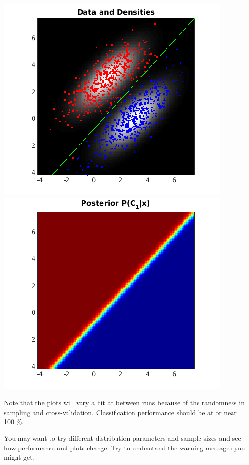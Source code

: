 \documentclass[10pt,a4paper,notitlepage]{report}
\begin{document}
\includegraphics[scale=0.6]{p1fig1.png}
\includegraphics[scale=0.6]{p1fig2.png}

Note that the plots will vary a bit at between runs because of the randomness in sampling and cross-validation. Classification performance should be at or near 100 \%.

You may want to try different distribution parameters and sample sizes and see how performance and plots change. Try to understand the warning messages you might get.
\end{document}

